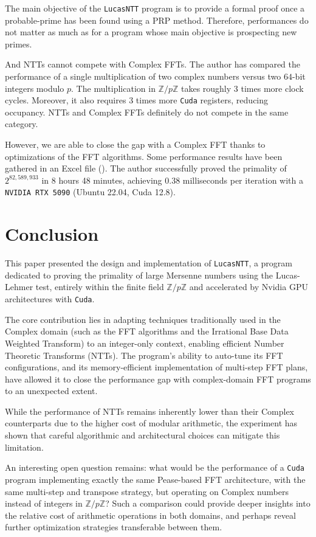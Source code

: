\documentclass{article}
\begin{document}
The main objective of the \texttt{LucasNTT} program is to provide a formal proof once a probable-prime has been found using a PRP method. Therefore, performances do not matter as much as for a program whose main objective is prospecting new primes.

And NTTs cannot compete with Complex FFTs. The author has compared the performance of a single multiplication of two complex numbers versus two $64$-bit integers modulo $p$. The multiplication in $\mathbb{Z}/p\mathbb{Z}$ takes roughly $3$ times more clock cycles. Moreover, it also requires $3$ times more \texttt{Cuda} registers, reducing occupancy. NTTs and Complex FFTs definitely do not compete in the same category.

However, we are able to close the gap with a Complex FFT thanks to optimizations of the FFT algorithms. Some performance results have been gathered in an Excel file (\cite{LucasNTT_FFT_Lengths}). The author successfully proved the primality of $2^{82,589,933}$ in 8 hours 48 minutes, achieving $0.38$ milliseconds per iteration with a \texttt{NVIDIA RTX 5090} (Ubuntu 22.04, Cuda 12.8). 

\section{Conclusion}

This paper presented the design and implementation of \texttt{LucasNTT}, a program dedicated to proving the primality of large Mersenne numbers using the Lucas-Lehmer test, entirely within the finite field $\mathbb{Z}/p\mathbb{Z}$ and accelerated by Nvidia GPU architectures with \texttt{Cuda}. 

The core contribution lies in adapting techniques traditionally used in the Complex domain (such as the FFT algorithms and the Irrational Base Data Weighted Transform) to an integer-only context, enabling efficient Number Theoretic Transforms (NTTs). The program’s ability to auto-tune its FFT configurations, and its memory-efficient implementation of multi-step FFT plans, have allowed it to close the performance gap with complex-domain FFT programs to an unexpected extent.

While the performance of NTTs remains inherently lower than their Complex counterparts due to the higher cost of modular arithmetic, the experiment has shown that careful algorithmic and architectural choices can mitigate this limitation.

An interesting open question remains: what would be the performance of a \texttt{Cuda} program implementing exactly the same Pease-based FFT architecture, with the same multi-step and transpose strategy, but operating on Complex numbers instead of integers in $\mathbb{Z}/p\mathbb{Z}$? Such a comparison could provide deeper insights into the relative cost of arithmetic operations in both domains, and perhaps reveal further optimization strategies transferable between them.

\newpage
  

\end{document}
